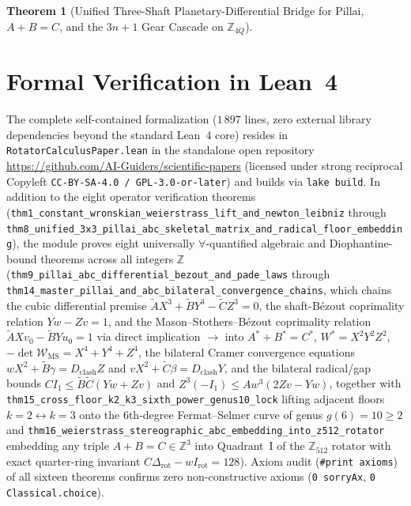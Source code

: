 \documentclass[11pt,a4paper]{article}
\theoremstyle{plain}
\newtheorem{theorem}{Theorem}[section]
\theoremstyle{definition}
\begin{document}
\begin{theorem}[Unified Three-Shaft Planetary-Differential Bridge for Pillai, $A+B=C$, and the $3n+1$ Gear Cascade on $\mathbb{Z}_{4Q}$]
\begin{enumerate}[label=\textbf{(\roman*)},leftmargin=*]
\end{enumerate}
\end{theorem}

\section{Formal Verification in Lean~4}
\label{sec:lean4}

The complete self-contained formalization ($1\,897$ lines, zero external library dependencies beyond the standard Lean~4 core) resides in \texttt{RotatorCalculusPaper.lean} in the standalone open repository \url{https://github.com/AI-Guiders/scientific-papers} (licensed under strong reciprocal Copyleft \texttt{CC-BY-SA-4.0 / GPL-3.0-or-later}) and builds via \texttt{lake build}. In addition to the eight operator verification theorems (\texttt{thm1\_constant\_wronskian\_weierstrass\_lift\_and\_newton\_leibniz} through \texttt{thm8\_unified\_3x3\_pillai\_abc\_skeletal\_matrix\_and\_radical\_floor\_embedding}), the module proves eight universally $\forall$-quantified algebraic and Diophantine-bound theorems across all integers $\mathbb{Z}$ (\texttt{thm9\_pillai\_abc\_differential\_bezout\_and\_pade\_laws} through \texttt{thm14\_master\_pillai\_and\_abc\_bilateral\_convergence\_chains}, which chains the cubic differential premise $\widetilde{A}X^3+\widetilde{B}Y^3-\widetilde{C}Z^3=0$, the shaft-B\'ezout coprimality relation $Yw-Zv=1$, and the Mason--Stothers--B\'ezout coprimality relation $\widetilde{A}Xv_0-\widetilde{B}Yu_0=1$ via direct implication $\to$ into $A^*+B^*=C^*$, $W^* = X^2 Y^2 Z^2$, $-\det\mathcal{W}_{\mathrm{MS}} = X^4+Y^4+Z^4$, the bilateral Cramer convergence equations $w X^2 + \widetilde{B}\gamma = D_{\mathrm{clash}} Z$ and $v X^2 + \widetilde{C}\beta = D_{\mathrm{clash}} Y$, and the bilateral radical/gap bounds $C I_1 \le \widetilde{B}\widetilde{C}(Yw+Zv)$ and $Z^3(-I_1) \le A w^3(2Zv-Yw)$, together with \texttt{thm15\_cross\_floor\_k2\_k3\_sixth\_power\_genus10\_lock} lifting adjacent floors $k=2 \leftrightarrow k=3$ onto the 6th-degree Fermat--Selmer curve of genus $g(6)=10\ge 2$ and \texttt{thm16\_weierstrass\_stereographic\_abc\_embedding\_into\_z512\_rotator} embedding any triple $A+B=C\in\mathbb{Z}^3$ into Quadrant~I of the $\mathbb{Z}_{512}$ rotator with exact quarter-ring invariant $C\Delta_{\mathrm{rot}} - w I_{\mathrm{rot}} = 128$). Axiom audit (\texttt{\#print axioms}) of all sixteen theorems confirms zero non-constructive axioms (\texttt{0 sorryAx}, \texttt{0 Classical.choice}).
\end{document}
